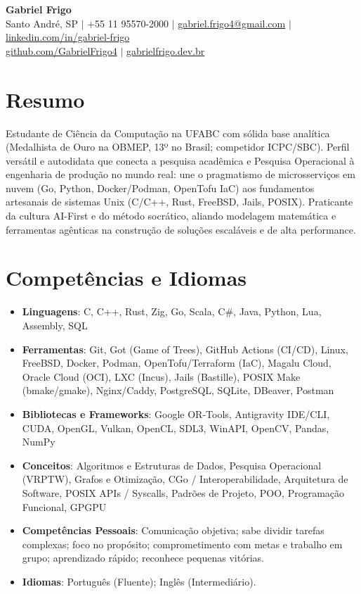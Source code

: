 \documentclass[letterpaper,10pt]{article}
\newcommand{\resumeItem}[1]{\item\small{#1}}
\newcommand{\resumeSubHeadingList}{\begin{itemize}[leftmargin=0.15in, label={}]}
\newcommand{\resumeSubHeadingListEnd}{\end{itemize}}
\begin{document}
\begin{center}
  \textbf{\Huge Gabriel Frigo} \\
  \small Santo André, SP $|$ +55 11 95570-2000 $|$ \href{mailto:gabriel.frigo4@gmail.com}{gabriel.frigo4@gmail.com} $|$
  \href{https://linkedin.com/in/gabriel-frigo-b6727b275/}{linkedin.com/in/gabriel-frigo} \\
  \href{https://github.com/GabrielFrigo4}{github.com/GabrielFrigo4} $|$
  \href{https://gabrielfrigo.dev.br}{gabrielfrigo.dev.br}
\end{center}

\section{Resumo}
Estudante de Ciência da Computação na UFABC com sólida base analítica (Medalhista de Ouro na OBMEP, 13º no Brasil; competidor ICPC/SBC). Perfil versátil e autodidata que conecta a pesquisa acadêmica e Pesquisa Operacional à engenharia de produção no mundo real: une o pragmatismo de microsserviços em nuvem (Go, Python, Docker/Podman, OpenTofu IaC) aos fundamentos artesanais de sistemas Unix (C/C++, Rust, FreeBSD, Jails, POSIX). Praticante da cultura AI-First e do método socrático, aliando modelagem matemática e ferramentas agênticas na construção de soluções escaláveis e de alta performance.

\section{Competências e Idiomas}
\resumeSubHeadingList
  \resumeItem{\textbf{Linguagens}: C, C++, Rust, Zig, Go, Scala, C\#, Java, Python, Lua, Assembly, SQL}
  \resumeItem{\textbf{Ferramentas}: Git, Got (Game of Trees), GitHub Actions (CI/CD), Linux, FreeBSD, Docker, Podman, OpenTofu/Terraform (IaC), Magalu Cloud, Oracle Cloud (OCI), LXC (Incus), Jails (Bastille), POSIX Make (bmake/gmake), Nginx/Caddy, PostgreSQL, SQLite, DBeaver, Postman}
  \resumeItem{\textbf{Bibliotecas e Frameworks}: Google OR-Tools, Antigravity IDE/CLI, CUDA, OpenGL, Vulkan, OpenCL, SDL3, WinAPI, OpenCV, Pandas, NumPy}
  \resumeItem{\textbf{Conceitos}: Algoritmos e Estruturas de Dados, Pesquisa Operacional (VRPTW), Grafos e Otimização, CGo / Interoperabilidade, Arquitetura de Software, POSIX APIs / Syscalls, Padrões de Projeto, POO, Programação Funcional, GPGPU}
  \resumeItem{\textbf{Competências Pessoais}: Comunicação objetiva; sabe dividir tarefas complexas; foco no propósito; comprometimento com metas e trabalho em grupo; aprendizado rápido; reconhece pequenas vitórias.}
  \resumeItem{\textbf{Idiomas}: Português (Fluente); Inglês (Intermediário).}
\resumeSubHeadingListEnd
\end{document}
